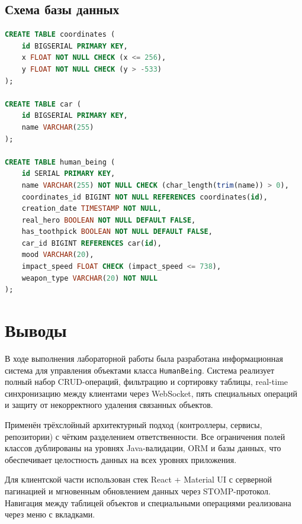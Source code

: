 \documentclass[14pt,a4paper]{extarticle}
\begin{document}
\subsection{Схема базы данных}
\begin{lstlisting}[language=SQL]
CREATE TABLE coordinates (
    id BIGSERIAL PRIMARY KEY,
    x FLOAT NOT NULL CHECK (x <= 256),
    y FLOAT NOT NULL CHECK (y > -533)
);

CREATE TABLE car (
    id BIGSERIAL PRIMARY KEY,
    name VARCHAR(255)
);

CREATE TABLE human_being (
    id SERIAL PRIMARY KEY,
    name VARCHAR(255) NOT NULL CHECK (char_length(trim(name)) > 0),
    coordinates_id BIGINT NOT NULL REFERENCES coordinates(id),
    creation_date TIMESTAMP NOT NULL,
    real_hero BOOLEAN NOT NULL DEFAULT FALSE,
    has_toothpick BOOLEAN NOT NULL DEFAULT FALSE,
    car_id BIGINT REFERENCES car(id),
    mood VARCHAR(20),
    impact_speed FLOAT CHECK (impact_speed <= 738),
    weapon_type VARCHAR(20) NOT NULL
);
\end{lstlisting}

\newpage
\section{Выводы}

В ходе выполнения лабораторной работы была разработана информационная система для управления объектами класса \texttt{HumanBeing}. Система реализует полный набор CRUD-операций, фильтрацию и сортировку таблицы, real-time синхронизацию между клиентами через WebSocket, пять специальных операций и защиту от некорректного удаления связанных объектов.

Применён трёхслойный архитектурный подход (контроллеры, сервисы, репозитории) с чётким разделением ответственности. Все ограничения полей классов дублированы на уровнях Java-валидации, ORM и базы данных, что обеспечивает целостность данных на всех уровнях приложения.

Для клиентской части использован стек React + Material UI с серверной пагинацией и мгновенным обновлением данных через STOMP-протокол. Навигация между таблицей объектов и специальными операциями реализована через меню с вкладками.
\end{document}
